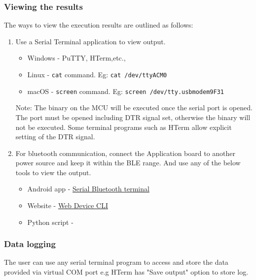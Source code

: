 \documentclass{article}
\begin{document}
\subsubsection{Viewing the results}
The ways to view the execution results are outlined as follows:
\begin{enumerate}
	\item Use a Serial Terminal application to view output.
	\begin{itemize}
		\item Windows - PuTTY, HTerm,etc.,
		\item Linux - \texttt{cat} command. Eg: \texttt{cat /dev/ttyACM0}
		\item macOS - \texttt{screen} command. Eg: \texttt{screen /dev/tty.usbmodem9F31}
	\end{itemize}
	Note: The binary on the MCU will be executed once the serial port is opened. The port must be opened including DTR signal set, otherwise the binary will not be executed. Some terminal programs such as HTerm allow explicit setting of the DTR signal.
	\item For bluetooth communication, connect the Application board to another power source and keep it within the BLE range. And use any of the below tools to view the output.
	\begin{itemize}
		\item Android app - \href{https://play.google.com/store/apps/details?id=de.kai_morich.serial_bluetooth_terminal}{Serial Bluetooth terminal}
		\item Website - \href{https://wiki.makerdiary.com/web-device-cli/}{Web Device CLI}
		\item Python script - 
	\end{itemize}
\end{enumerate}

\subsubsection{Data logging}
The user can use any serial terminal program to access and store the data provided via virtual COM port e.g HTerm has "Save output" option to store log.
\end{document}
